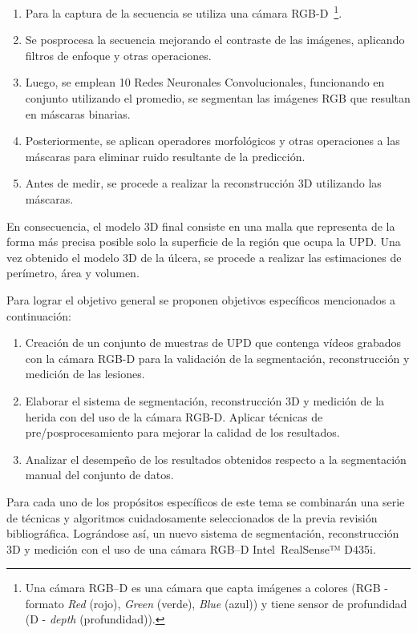 \begin{enumerate}
	\item Para la captura de la secuencia se utiliza una cámara RGB-D~\footnote{Una cámara RGB–D es una cámara que capta imágenes a colores (RGB - formato \textit{Red} (rojo), \textit{Green} (verde), \textit{Blue} (azul)) y tiene sensor de profundidad (D - \textit{depth} (profundidad)).}.
	\item Se posprocesa la secuencia mejorando el contraste de las imágenes, aplicando filtros de enfoque y otras operaciones.
	\item Luego, se emplean 10 Redes Neuronales Convolucionales, funcionando en conjunto utilizando el promedio, se segmentan las imágenes RGB que resultan en máscaras binarias.
	\item Posteriormente, se aplican operadores morfológicos y otras operaciones a las máscaras para eliminar ruido resultante de la predicción.
	\item Antes de medir, se procede a realizar la reconstrucción 3D utilizando las máscaras.
\end{enumerate}


En consecuencia, el modelo 3D final consiste en una malla que representa de la forma más precisa posible solo la superficie de la región que ocupa la UPD. Una vez obtenido el modelo 3D de la úlcera, se procede a realizar las estimaciones de perímetro, área y volumen.

Para lograr el objetivo general se proponen objetivos específicos mencionados a continuación:

\begin{enumerate}
	\item Creación de un conjunto de muestras de UPD que contenga vídeos grabados con la cámara RGB-D para la validación de la segmentación, reconstrucción y medición de las lesiones.
	\item Elaborar el sistema de segmentación, reconstrucción 3D y medición de la herida con del uso de la cámara RGB-D. Aplicar técnicas de pre/posprocesamiento para mejorar la calidad de los resultados.
	\item Analizar el desempeño de los resultados obtenidos respecto a la segmentación manual del conjunto de datos.
\end{enumerate}

Para cada uno de los propósitos específicos de este tema se combinarán una serie de técnicas y algoritmos cuidadosamente seleccionados de la previa revisión bibliográfica. Lográndose así, un nuevo sistema de segmentación, reconstrucción 3D y medición con el uso de una cámara RGB–D Intel~\textregistered RealSense™ D435i.

